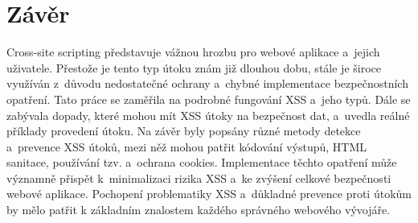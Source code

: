 \documentclass[11pt, conference, a4paper]{IEEEtran}
\begin{document}
\section{Závěr}
Cross-site scripting představuje vážnou hrozbu pro webové aplikace a~jejich uživatele. Přestože je tento typ útoku znám již dlouhou dobu, stále je široce využíván z~důvodu nedostatečné ochrany a~chybné implementace bezpečnostních opatření. Tato práce se zaměřila na podrobné fungování XSS a~jeho typů. Dále se zabývala dopady, které mohou mít XSS útoky na bezpečnost dat, a~uvedla reálné příklady provedení útoku. Na závěr byly popsány různé metody detekce a~prevence XSS útoků, mezi něž mohou patřit kódování výstupů, HTML sanitace, používání tzv.  a~ochrana cookies. Implementace těchto opatření může významně přispět k~minimalizaci rizika XSS a~ke zvýšení celkové bezpečnosti webové aplikace. Pochopení problematiky XSS a~důkladné prevence proti útokům by mělo patřit k základním znalostem každého správného webového vývojáře.


  
  
\end{document}
